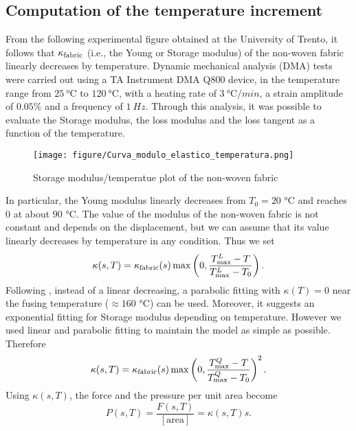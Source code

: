 \subsection{Computation of the temperature increment}
From the following experimental figure obtained at the University of Trento, it follows that $\kappa_{\mathrm{fabric}}$ (i.e., the Young or Storage modulus) of the non-woven fabric linearly decreases by temperature. Dynamic mechanical analysis (DMA) tests were carried out using a TA Instrument DMA Q800 device, in the temperature range from $25\ \unit{\celsius}$ to $120\ \unit{\celsius}$, with a heating rate of $3\ \unit{\celsius}/\unit{min}$, a strain amplitude of $0.05\%$ and a frequency of $1\ \unit{Hz}$. Through this analysis, it was possible to evaluate the Storage modulus, the loss modulus and the loss tangent as a function of the temperature. 
\begin{figure}[H]
  \begin{center}
    \texttt{[image: figure/Curva\_modulo\_elastico\_temperatura.png]}
  \end{center}
  \caption{Storage modulus/temperatue plot of the non-woven fabric}
  \label{fig:stiffness:temperature}
\end{figure}
In particular, the Young modulus linearly decreases from $T_0=20$ $\unit{\celsius}$ and reaches $0$ at about $90$ $\unit{\celsius}$. The value of the modulus of the non-woven fabric is not constant and depends on the displacement, but we can assume that its value linearly decreases by temperature in any condition. Thus we set
\[
  \kappa(s,T)
  = \kappa_{\mathrm{fabric}}(s) \max\left(0,\dfrac{{T_{\max}^L}-T}{{T_{\max}^L}-T_0}\right).
\]
Following \cite{Young}, instead of a linear decreasing, a parabolic fitting with $\kappa(T)=0$ near the fusing temperature ($\approx 160$ $\unit{\celsius}$) can be used. Moreover, it suggests an exponential fitting for Storage modulus depending on temperature. However we used linear and parabolic fitting to maintain the model as simple as possible.
Therefore
\begin{equation}\label{eq:kappaT}
   \kappa(s,T)
   = \kappa_{\mathrm{fabric}}(s)\max\left(0,\dfrac{{T_{\max}^Q}-T}{{T_{\max}^Q}-T_0}\right)^2.
\end{equation}
Using $\kappa(s,T)$, the force and the pressure per unit area become
\begin{equation}\label{eq:pressure:tissue}
  P(s,T) = \dfrac{F(s,T)}{[\textrm{area}]} = \kappa(s,T)s.
\end{equation}
